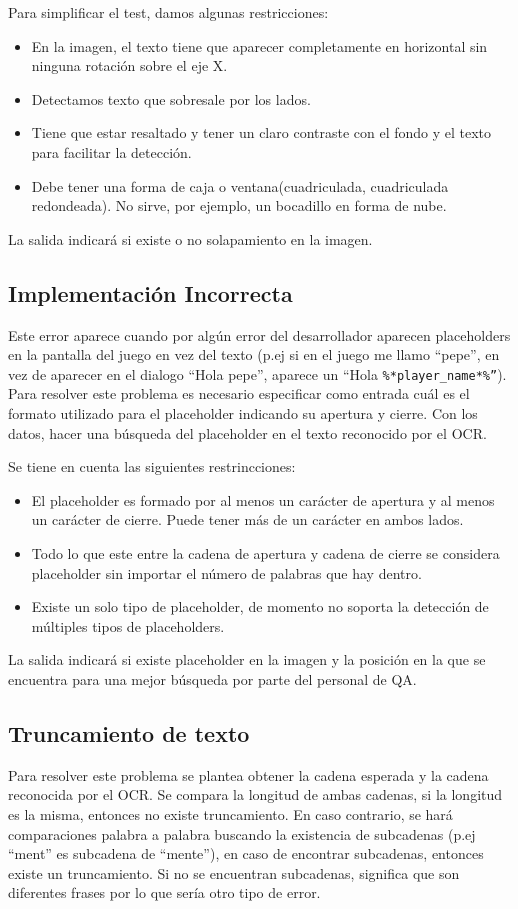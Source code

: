 Para simplificar el test, damos algunas restricciones: 
\begin{itemize}
	\item En la imagen, el texto tiene que aparecer completamente en horizontal sin ninguna rotación sobre el eje X.
	\item Detectamos texto que sobresale por los lados.
	\item Tiene que estar resaltado y tener un claro contraste con el fondo y el texto para facilitar la detección.
	\item Debe tener una forma de caja o ventana(cuadriculada, cuadriculada redondeada). No sirve, por ejemplo, un bocadillo en forma de nube.
\end{itemize} 
La salida indicará si existe o no solapamiento en la imagen.

\subsection{Implementación Incorrecta}
\label{test:placeholder}
Este error aparece cuando por algún error del desarrollador aparecen placeholders en la pantalla del juego en vez del texto (p.ej si en el juego me llamo ``pepe'', en vez de aparecer en el dialogo ``Hola pepe'', aparece un ``Hola      \texttt{\%*player\_name*\%''}).
Para resolver este problema es necesario especificar como entrada cuál es el formato utilizado para el placeholder indicando su apertura y cierre. Con los datos, hacer una búsqueda del placeholder en el texto reconocido por el OCR.

Se tiene en cuenta las siguientes restrincciones:
\begin{itemize}
	\item El placeholder es formado por al menos un carácter de apertura y al menos un carácter de cierre. Puede tener más de un carácter en ambos lados.
	\item Todo lo que este entre la cadena de apertura y cadena de cierre se considera placeholder sin importar el número de palabras que hay dentro.
	\item Existe un solo tipo de placeholder, de momento no soporta la detección de múltiples tipos de placeholders.
\end{itemize}
La salida indicará si existe placeholder en la imagen y la posición en la que se encuentra para una mejor búsqueda por parte del personal de QA.
\subsection{Truncamiento de texto}
\label{test:trunc}
Para resolver este problema se plantea obtener la cadena esperada y la cadena reconocida por el OCR. Se compara la longitud de ambas cadenas, si la longitud es la misma, entonces no existe truncamiento. En caso contrario, se hará comparaciones palabra a palabra buscando la existencia de subcadenas (p.ej ``ment'' es subcadena de ``mente''), en caso de encontrar subcadenas, entonces existe un truncamiento. Si no se encuentran subcadenas, significa que son diferentes frases por lo que sería otro tipo de error.

